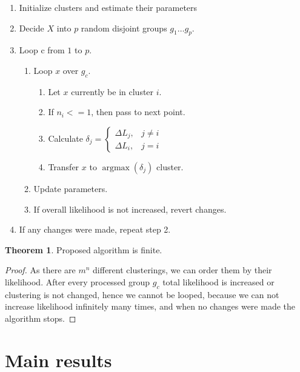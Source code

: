 \documentclass[a4paper, 12pt]{article}
\DeclareMathOperator{\argmax}{argmax}
\theoremstyle{definition}
\theoremstyle{definition}
\newtheorem{theorem}{Theorem}
\theoremstyle{remark}
\begin{document}
\begin{enumerate}
    \item Initialize clusters and estimate their parameters
    \item Decide $X$ into $p$ random disjoint groups $g_1 \ldots g_p$.
    \item Loop c from $1$ to $p$.
    \begin{enumerate}
        \item Loop $x$ over $g_c$.
        \begin{enumerate}
            \item Let $x$ currently be in cluster $i$.
            \item If $n_i <= 1$, then pass to next point.
            \item Calculate $\delta_{j}=
                \left\{\begin{array}{cc}
                \Delta L_{j}, & j \neq i \\
                \Delta L_{i}, & j=i
                \end{array}\right. $
            \item Transfer $x$ to $\argmax (\delta_j)$ cluster.
        \end{enumerate} 
        \item Update parameters.
        \item If overall likelihood is not increased, revert changes.
    \end{enumerate}
    \item If any changes were made, repeat step 2.
\end{enumerate}

\begin{theorem}
    Proposed algorithm is finite.    
\end{theorem}
\begin{proof}
    As there are $m^n$ different clusterings, we can order them by their likelihood.
    After every processed group $g_c$ total likelihood is increased or clustering is not changed, 
    hence we cannot be looped, because we can not increase likelihood infinitely many times, 
    and when no changes were made the algorithm stops.  
\end{proof}


\section{Main results}
\end{document}
